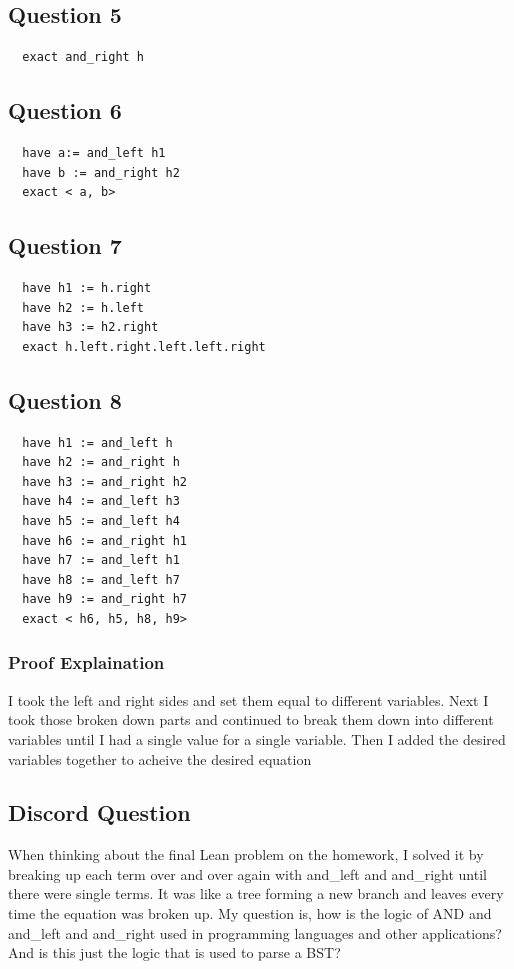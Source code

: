 \documentclass{article}
\theoremstyle{plain}
\theoremstyle{definition}
\theoremstyle{remark}
\begin{document}
\subsection{Question 5}

\begin{lstlisting}
  exact and_right h
\end{lstlisting}

\subsection{Question 6}

\begin{lstlisting}
  have a:= and_left h1
  have b := and_right h2
  exact < a, b>
\end{lstlisting}

\subsection{Question 7}

\begin{lstlisting}
  have h1 := h.right
  have h2 := h.left
  have h3 := h2.right
  exact h.left.right.left.left.right
\end{lstlisting}

\subsection{Question 8}

\begin{lstlisting}
  have h1 := and_left h
  have h2 := and_right h
  have h3 := and_right h2
  have h4 := and_left h3
  have h5 := and_left h4
  have h6 := and_right h1
  have h7 := and_left h1
  have h8 := and_left h7
  have h9 := and_right h7
  exact < h6, h5, h8, h9>
\end{lstlisting}

\subsubsection{Proof Explaination}
I took the left and right sides and set them equal to different variables. Next I took those broken down parts and continued to break them down into different variables until I had a single value for a single variable. Then I added the desired variables together to acheive the desired equation

\subsection{Discord Question}
When thinking about the final Lean problem on the homework, I solved it by breaking up each term over and over again with and\_left and and\_right until there were single terms. It was like a tree forming a new branch and leaves every time the equation was broken up. My question is, how is the logic of AND and and\_left and and\_right used in programming languages and other applications? And is this just the logic that is used to parse a BST?	
\end{document}
